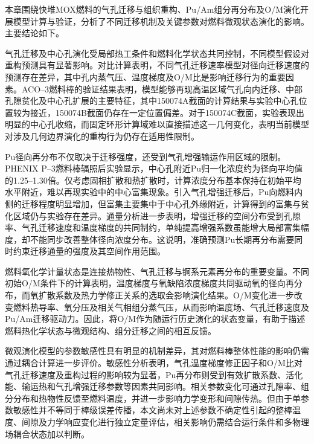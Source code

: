 \label{sec:ch3_summary}

本章围绕快堆MOX燃料的气孔迁移与组织重构、Pu/Am组分再分布及O/M演化开展模型计算与验证，分析了不同迁移机制及关键参数对燃料微观状态演化的影响。主要结论如下。

气孔迁移及中心孔演化受局部热工条件和燃料化学状态共同控制，不同模型假设对重构预测具有显著影响。对比计算表明，不同气孔迁移速率模型对径向迁移速度的预测存在差异，其中孔内蒸气压、温度梯度及O/M比是影响迁移行为的重要因素。ACO–3燃料棒的验证结果表明，模型能够再现高温区域气孔向内迁移、中部孔隙贫化及中心孔扩展的主要特征，其中150074A截面的计算结果与实验中心孔位置较为接近，150074B截面仍存在一定位置偏差。对于150074C截面，实验表现出明显的中心孔收缩，而固定环形计算域难以直接描述这一几何变化，表明当前模型对涉及几何边界演化的重构行为仍存在适用性限制。

Pu径向再分布不仅取决于迁移强度，还受到气孔增强输运作用区域的限制。PHENIX P–3燃料棒辐照后实验显示，中心孔附近Pu归一化浓度约为径向平均值的1.25–1.30倍。仅考虑固相扩散和热扩散时，计算浓度分布基本保持在初始平均水平附近，难以再现实验中的中心富集现象。引入气孔增强迁移后，Pu向燃料内侧的迁移程度明显增加，但富集主要集中于中心孔外缘附近，计算得到的富集与贫化区域仍与实验存在差异。通量分析进一步表明，增强迁移的空间分布受到孔隙率、气孔迁移速度和温度梯度的共同制约，单纯提高增强系数虽能增大局部富集幅度，却不能同步改善整体径向浓度分布。这说明，准确预测Pu长期再分布需要同时约束迁移通量的强度及其空间作用范围。

燃料氧化学计量状态是连接热物性、气孔迁移与锕系元素再分布的重要变量。不同初始O/M条件下的计算表明，温度梯度与氧缺陷浓度梯度共同驱动氧的径向再分布，而氧扩散系数及热力学修正关系的选取会影响演化结果。O/M变化进一步改变燃料热导率、氧分压及相关气相组分蒸气压，从而影响温度场、气孔迁移速度及Pu/Am迁移驱动力。因此，将O/M作为随运行历史演化的状态变量，有助于描述燃料热化学状态与微观结构、组分迁移之间的相互反馈。

微观演化模型的参数敏感性具有明显的机制差异，其对燃料棒整体性能的影响仍需通过耦合计算进一步评价。敏感性分析表明，气孔温度梯度修正因子和O/M比对气孔迁移速度及重构过程的影响较为显著，Pu再分布则受到有效扩散系数、活化能、输运热和气孔增强迁移参数等因素共同影响。相关参数变化可通过孔隙率、组分分布和热物性反馈至燃料温度，并进一步影响力学变形和间隙传热。但由于单参数敏感性并不等同于棒级误差传播，本文尚未对上述参数不确定性引起的整棒温度、间隙及力学响应变化进行独立定量评估，相关影响仍需结合运行条件和多物理场耦合状态加以判断。


